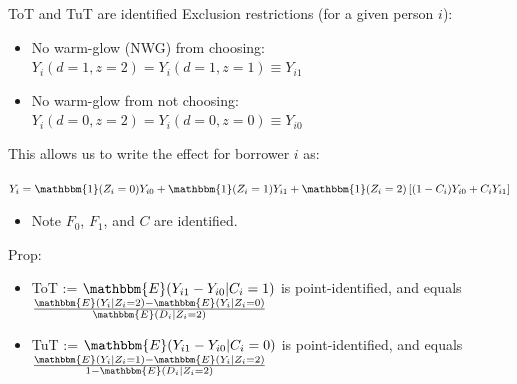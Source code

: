 \documentclass[9pt, aspectratio=169]{beamer}
\begin{document}
\begin{frame}{ToT and TuT are identified}
Exclusion restrictions (for a given person $i$):
\begin{itemize}
        \item No warm-glow 
        (NWG) from choosing: $Y_i(d=1,z=2)=Y_i(d=1,z=1) \equiv Y_{i1}$
        \item  No warm-glow from not choosing: $Y_i(d=0,z=2)=Y_i(d=0,z=0) \equiv Y_{i0}$
    \end{itemize}
\pause \vfill This allows us to write the effect for borrower $i$ as:
\begin{center}
    $Y_i = \mathbbm{1}(Z_i =0) Y_{i0} + \mathbbm{1}(Z_i = 1)  Y_{i1}  + \mathbbm{1}(Z_i = 2) \left[(1 - C_i) Y_{i0} + C_i Y_{i1} \right]$
\end{center}
   
\begin{itemize}
    \item Note $F_0$, $F_1$, and $C$ are identified.
\end{itemize}
\vspace{.1in}

\pause Prop:
\begin{itemize}
    \item ToT := $\mathbbm{E}(Y_{i1} - Y_{i0} | C_i = 1)$ is point-identified, and equals $\frac{\mathbbm{E}(Y_i|Z_i=2) - \mathbbm{E}(Y_i|Z_i =0)}{\mathbbm{E}(D_i|Z_i=2)} $
     \item TuT := $\mathbbm{E}(Y_{i1} - Y_{i0} | C_i = 0)$ is point-identified, and equals $\frac{\mathbbm{E}(Y_i|Z_i=1) - \mathbbm{E}(Y_i|Z_i =2)}{1-\mathbbm{E}(D_i|Z_i=2)} $
\end{itemize}
\end{frame}
\end{document}
